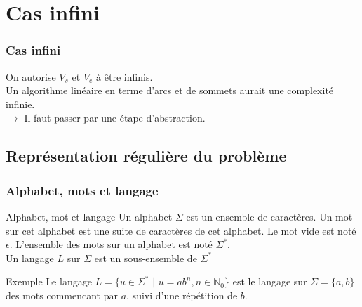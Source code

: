 \documentclass{beamer}
\begin{document}
\section{Cas infini}
\begin{frame}
\frametitle{Cas infini} %
On autorise $V_s$ et $V_e$ à être infinis.\\[3mm]

Un algorithme linéaire en terme d'arcs et de sommets aurait une complexité \alert{infinie}.\\[3mm]
$\rightarrow$ Il faut passer par une étape d'abstraction.
\end{frame}

\subsection{Représentation régulière du problème}
\begin{frame}
\frametitle{Alphabet, mots et langage}
\begin{block}{Alphabet, mot et langage}
Un alphabet $\Sigma$ est un ensemble de caractères. Un mot sur cet alphabet est une suite de caractères de cet alphabet. Le mot vide est noté $\epsilon$. L'ensemble des mots sur un alphabet est noté $\Sigma^*$.\\
Un langage $L$ sur $\Sigma$ est un sous-ensemble de $\Sigma^*$\\[3mm]
\end{block}
\begin{exampleblock}{Exemple}
Le langage $L=\{u\in\Sigma^*$ $|$ $u=ab^n, n\in\mathbb{N}_0\}$ est le langage sur $\Sigma=\{a,b\}$ des mots commencant par $a$, suivi d'une répétition de $b$.
\end{exampleblock}
\end{frame}
\end{document}
